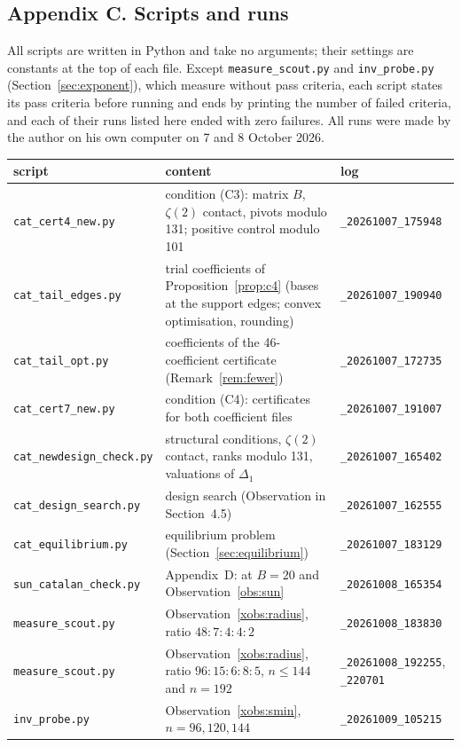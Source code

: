 \documentclass[11pt]{article}
\theoremstyle{definition}
\begin{document}
\clearpage
\subsection*{Appendix C. Scripts and runs}

All scripts are written in Python and take no arguments; their settings are constants at the top of each file. Except \texttt{measure\_scout.py} and \texttt{inv\_probe.py} (Section~\ref{sec:exponent}), which measure without pass criteria, each script states its pass criteria before running and ends by printing the number of failed criteria, and each of their runs listed here ended with zero failures. All runs were made by the author on his own computer on 7 and 8 October 2026.

\begin{center}
\small
\begin{tabular}{p{4.2cm}p{7.2cm}p{3.6cm}}
\toprule
script & content & log\\
\midrule
\texttt{cat\_cert4\_new.py} & condition (C3): matrix $B$, $\zeta(2)$ contact, pivots modulo 131; positive control \cite[Table~1]{OAI} modulo 101 & \texttt{\_20261007\_175948}\\
\texttt{cat\_tail\_edges.py} & trial coefficients of Proposition~\ref{prop:c4} (bases at the support edges; convex optimisation, rounding) & \texttt{\_20261007\_190940}\\
\texttt{cat\_tail\_opt.py} & coefficients of the 46-coefficient certificate (Remark~\ref{rem:fewer}) & \texttt{\_20261007\_172735}\\
\texttt{cat\_cert7\_new.py} & condition (C4): certificates for both coefficient files & \texttt{\_20261007\_191007}\\
\texttt{cat\_newdesign\_check.py} & structural conditions, $\zeta(2)$ contact, ranks modulo 131, valuations of $\Delta_1$ & \texttt{\_20261007\_165402}\\
\texttt{cat\_design\_search.py} & design search (Observation in Section~4.5) & \texttt{\_20261007\_162555}\\
\texttt{cat\_equilibrium.py} & equilibrium problem (Section~\ref{sec:equilibrium}) & \texttt{\_20261007\_183129}\\
\texttt{sun\_catalan\_check.py} & Appendix~D: \cite[Proposition~3.1]{Sun} at $B=20$ and Observation~\ref{obs:sun} & \texttt{\_20261008\_165354}\\
\texttt{measure\_scout.py} & Observation~\ref{xobs:radius}, ratio $48:7:4:4:2$ & \texttt{\_20261008\_183830}\\
\texttt{measure\_scout.py} & Observation~\ref{xobs:radius}, ratio $96:15:6:8:5$, $n\le144$ and $n=192$ & \texttt{\_20261008\_192255}, \texttt{\_220701}\\
\texttt{inv\_probe.py} & Observation~\ref{xobs:smin}, $n=96,120,144$ & \texttt{\_20261009\_105215}\\
\bottomrule
\end{tabular}
\end{center}
\end{document}
